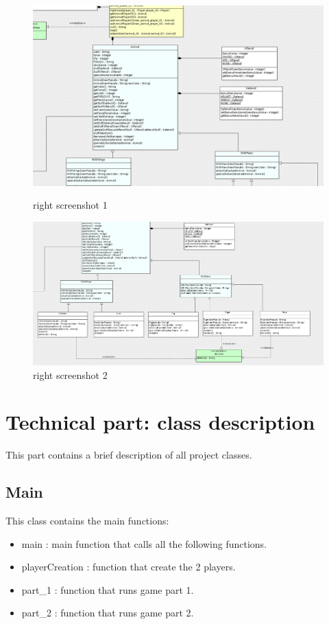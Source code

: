 \begin{figure}
  \includegraphics[width=450pt]{../../Images/2_2-3_2-3_3.png}
  \caption{\small right screenshot 1}
  \includegraphics[width=450pt]{../../Images/2_3-3_3.png}
  \caption{\small right screenshot 2}
\end{figure}

\section{Technical part: class description}

This part contains a brief description of all project classes.

\subsection{Main}

This class contains the main functions:

\begin{itemize}
 \item main : main function that calls all the following functions.
 \item playerCreation : function that create the 2 players.
 \item part\_1 : function that runs game part 1.
 \item part\_2 : function that runs game part 2.
\end{itemize}


